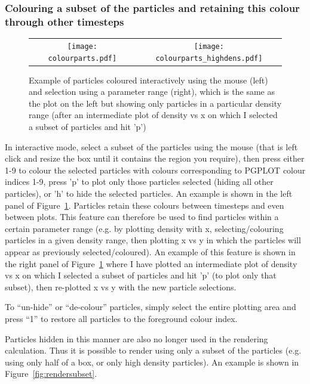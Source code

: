 \documentclass[a4paper,10pt]{article}
\begin{document}
\subsubsection{ Colouring a subset of the particles and retaining this colour through other timesteps}
\label{sec:colourparts}

\begin{figure}
\centering
\begin{tabular}{cc}
\texttt{[image: colourparts.pdf]} &
\texttt{[image: colourparts\_highdens.pdf]}
\end{tabular}
\caption{Example of particles coloured interactively using the mouse (left) and selection using a parameter range (right), which is the same as the plot on the left but showing only particles in a particular density range (after an intermediate plot of density vs x on which I selected a subset of particles and hit 'p')}
\label{fig:colourparts}
\end{figure}

 In interactive mode, select a subset of the particles using the mouse (that is left click and resize the box until it contains the region you require), then press either 1-9 to colour the selected particles with colours corresponding to PGPLOT colour indices 1-9, press 'p' to plot only those particles selected (hiding all other particles), or 'h' to hide the selected particles. An example is shown in the left panel of Figure~\ref{fig:colourparts}.  Particles retain these colours between timesteps and even between plots. This feature can therefore be used to find particles within a certain parameter range (e.g. by plotting density with x, selecting/colouring particles in a given density range, then plotting x vs y in which the particles will appear as previously selected/coloured). An example of this feature is shown in the right panel of Figure~\ref{fig:colourparts} where I have plotted an intermediate plot of density vs x on which I selected a subset of particles and hit 'p' (to plot only that subset), then re-plotted x vs y with the new particle selections.
 
 To ``un-hide'' or ``de-colour'' particles, simply select the entire plotting area and press ``1'' to restore all particles to the foreground colour index.
 
  Particles hidden in this manner are also no longer used in the rendering calculation. Thus it is possible to render using only a subset of the particles (e.g. using only half of a box, or only high density particles). An example is shown in Figure~\ref{fig:rendersubset}.
\end{document}

